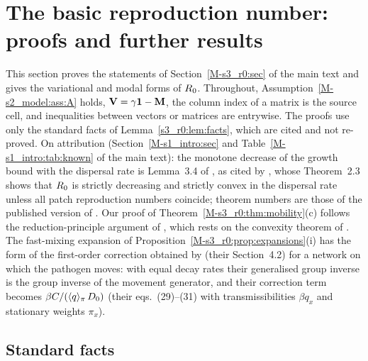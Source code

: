 \section{The basic reproduction number: proofs and further results}\label{appS_r0:sec}

This section proves the statements of Section~\ref{M-s3_r0:sec} of the main text and gives the variational and modal
forms of $R_0$. Throughout, Assumption~\ref{M-s2_model:ass:A} holds, $\mathbf{V}=\gamma\mathbf{1}-\mathbf{M}$, the column index of a matrix
is the source cell, and inequalities between vectors or matrices are entrywise. The proofs use only the standard facts
of Lemma~\ref{s3_r0:lem:facts}, which are cited and not re-proved. On attribution (Section~\ref{M-s1_intro:sec} and
Table~\ref{M-s1_intro:tab:known} of the main text): the monotone decrease of the growth bound with the dispersal rate is
Lemma~3.4 of \citet{allen2007asymptotic}, as cited by \citet{gao2020fast}, whose Theorem~2.3 shows that $R_0$ is
strictly decreasing and strictly convex in the dispersal rate unless all patch reproduction numbers coincide; theorem
numbers are those of the published version of \citet{gao2020fast}. Our proof of
Theorem~\ref{M-s3_r0:thm:mobility}(c) follows the reduction-principle argument of \citet{altenberg2012resolvent}, which
rests on the convexity theorem of \citet{cohen1981convexity}. The fast-mixing expansion of
Proposition~\ref{M-s3_r0:prop:expansions}(i) has the form of the first-order correction obtained by
\citet{tien2015disease} (their Section~4.2) for a network on which the pathogen moves: with equal decay rates their
generalised group inverse is the group inverse of the movement generator, and their correction term becomes
$\beta C/(\langle q\rangle_{\pi}\,D_0)$ (their eqs.~(29)--(31) with transmissibilities $\beta q_x$ and stationary weights $\pi_x$).

\subsection{Standard facts}\label{appS_r0:sec:facts}

